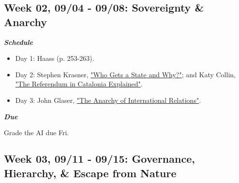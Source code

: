 \documentclass[11pt,]{article}
\begin{document}
\hypertarget{week-02-0904---0908-sovereignty-anarchy}{%
\subsection{Week 02, 09/04 - 09/08: Sovereignty \&
Anarchy}\label{week-02-0904---0908-sovereignty-anarchy}}

\begin{multicols}{2}

\textbf{\textit{Schedule}}

\begin{itemize}

\item Day 1: Haass (p. 253-263). 

\item Day 2: Stephen Krasner, \href{https://www.foreignaffairs.com/articles/andorra/2009-03-30/who-gets-state-and-why}{"Who Gets a State and Why?"}; and Katy Collin, \href{https://www.brookings.edu/blog/order-from-chaos/2017/09/29/the-referendum-in-catalonia-explained/}{"The Referendum in Catalonia Explained"}.

\item Day 3: John Glaser, \href{https://www.cato-unbound.org/2019/09/18/john-glaser/anarchy-international-relations/}{"The Anarchy of International Relations"}.

\end{itemize}

\columnbreak

\begin{flushright}

\textbf{\textit{Due}}

Grade the AI due Fri.

\end{flushright}

\end{multicols}

\hypertarget{week-03-0911---0915-governance-hierarchy-escape-from-nature}{%
\subsection{Week 03, 09/11 - 09/15: Governance, Hierarchy, \& Escape
from
Nature}\label{week-03-0911---0915-governance-hierarchy-escape-from-nature}}
\end{document}
